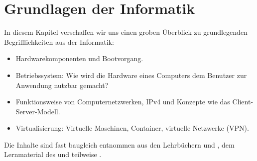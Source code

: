 \section{Grundlagen der Informatik}
In diesem Kapitel verschaffen wir uns einen groben Überblick zu grundlegenden Begrifflichkeiten aus der Informatik:
\begin{itemize}
	\item Hardwarekomponenten und Bootvorgang.
	\item Betriebssystem:  Wie wird die Hardware eines Computers dem Benutzer zur Anwendung nutzbar gemacht?
	\item Funktionsweise von Computernetzwerken, IPv4 und Konzepte wie das Client-Server-Modell.
	\item Virtualisierung: Virtuelle Maschinen, Container, virtuelle Netzwerke (VPN).
\end{itemize}
Die Inhalte sind fast baugleich entnommen aus den Lehrbüchern \cite{gumm3} und \cite{gumm2}, dem Lernmaterial des  und teilweise .

%
%
%
